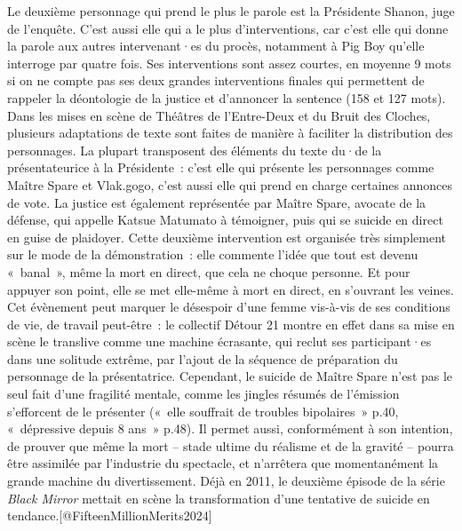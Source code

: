 \documentclass[
]{article}
\begin{document}
Le deuxième personnage qui prend le plus le parole est la Présidente Shanon, juge de l'enquête. C'est aussi elle qui a le plus d'interventions, car c'est elle qui donne la parole aux autres intervenant·es du procès, notamment à Pig Boy qu'elle interroge par quatre fois. Ses interventions sont assez courtes, en moyenne 9 mots si on ne compte pas ses deux grandes interventions finales qui permettent de rappeler la déontologie de la justice et d'annoncer la sentence (158 et 127 mots). Dans les mises en scène de Théâtres de l'Entre-Deux et du Bruit des Cloches, plusieurs adaptations de texte sont faites de manière à faciliter la distribution des personnages. La plupart transposent des éléments du texte du·de la présentateurice à la Présidente~: c'est elle qui présente les personnages comme Maître Spare et Vlak.gogo, c'est aussi elle qui prend en charge certaines annonces de vote. La justice est également représentée par Maître Spare, avocate de la défense, qui appelle Katsue Matumato à témoigner, puis qui se suicide en direct en guise de plaidoyer. Cette deuxième intervention est organisée très simplement sur le mode de la démonstration~: elle commente l'idée que tout est devenu «~banal~», même la mort en direct, que cela ne choque personne. Et pour appuyer son point, elle se met elle-même à mort en direct, en s'ouvrant les veines. Cet évènement peut marquer le désespoir d'une femme vis-à-vis de ses conditions de vie, de travail peut-être~: le collectif Détour 21 montre en effet dans sa mise en scène le translive comme une machine écrasante, qui reclut ses participant·es dans une solitude extrême, par l'ajout de la séquence de préparation du personnage de la présentatrice. Cependant, le suicide de Maître Spare n'est pas le seul fait d'une fragilité mentale, comme les jingles résumés de l'émission s'efforcent de le présenter («~elle souffrait de troubles bipolaires~» p.40, «~dépressive depuis 8 ans~» p.48). Il permet aussi, conformément à son intention, de prouver que même la mort -- stade ultime du réalisme et de la gravité -- pourra être assimilée par l'industrie du spectacle, et n'arrêtera que momentanément la grande machine du divertissement. Déjà en 2011, le deuxième épisode de la série \emph{Black Mirror} mettait en scène la transformation d'une tentative de suicide en tendance.{[}@FifteenMillionMerits2024{]}
\end{document}
